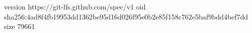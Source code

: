 version https://git-lfs.github.com/spec/v1
oid sha256:4ad8f4fb19953dd1362be95d16d026f95e0b2e85f158c762e5baf9bdd4bef7dd
size 79661

